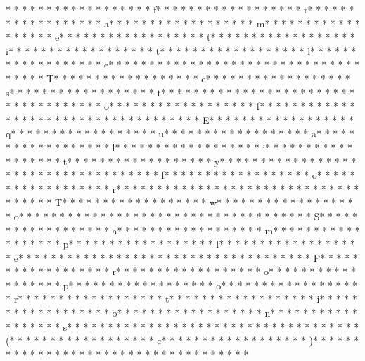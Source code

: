 * * *  * * *  * * *  *  * * *  *  * * *  * f* * *  * * *  * * *  *  * * *  *  * * *  * r* * *  * * *  * * *  *  * * *  *  * * *  * a* * *  * * *  * * *  *  * * *  *  * * *  * m* * *  * * *  * * *  *  * * *  *  * * *  * e* * *  * * *  * * *  *  * * *  *  * * *  * t* * *  * * *  * * *  *  * * *  *  * * *  * i* * *  * * *  * * *  *  * * *  *  * * *  * t* * *  * * *  * * *  *  * * *  *  * * *  * l* * *  * * *  * * *  *  * * *  *  * * *  * e* * *  * * *  * * *  *  * * *  *  * * *  * {* * *  * * *  * * *  *  * * *  *  * * *  * T* * *  * * *  * * *  *  * * *  *  * * *  * e* * *  * * *  * * *  *  * * *  *  * * *  * s* * *  * * *  * * *  *  * * *  *  * * *  * t* * *  * * *  * * *  *  * * *  *  * * *  *  * * *  * * *  * * *  *  * * *  *  * * *  * o* * *  * * *  * * *  *  * * *  *  * * *  * f* * *  * * *  * * *  *  * * *  *  * * *  *  * * *  * * *  * * *  *  * * *  *  * * *  * E* * *  * * *  * * *  *  * * *  *  * * *  * q* * *  * * *  * * *  *  * * *  *  * * *  * u* * *  * * *  * * *  *  * * *  *  * * *  * a* * *  * * *  * * *  *  * * *  *  * * *  * l* * *  * * *  * * *  *  * * *  *  * * *  * i* * *  * * *  * * *  *  * * *  *  * * *  * t* * *  * * *  * * *  *  * * *  *  * * *  * y* * *  * * *  * * *  *  * * *  *  * * *  *  * * *  * * *  * * *  *  * * *  *  * * *  * f* * *  * * *  * * *  *  * * *  *  * * *  * o* * *  * * *  * * *  *  * * *  *  * * *  * r* * *  * * *  * * *  *  * * *  *  * * *  *  * * *  * * *  * * *  *  * * *  *  * * *  * T* * *  * * *  * * *  *  * * *  *  * * *  * w* * *  * * *  * * *  *  * * *  *  * * *  * o* * *  * * *  * * *  *  * * *  *  * * *  *  * * *  * * *  * * *  *  * * *  *  * * *  * S* * *  * * *  * * *  *  * * *  *  * * *  * a* * *  * * *  * * *  *  * * *  *  * * *  * m* * *  * * *  * * *  *  * * *  *  * * *  * p* * *  * * *  * * *  *  * * *  *  * * *  * l* * *  * * *  * * *  *  * * *  *  * * *  * e* * *  * * *  * * *  *  * * *  *  * * *  *  * * *  * * *  * * *  *  * * *  *  * * *  * P* * *  * * *  * * *  *  * * *  *  * * *  * r* * *  * * *  * * *  *  * * *  *  * * *  * o* * *  * * *  * * *  *  * * *  *  * * *  * p* * *  * * *  * * *  *  * * *  *  * * *  * o* * *  * * *  * * *  *  * * *  *  * * *  * r* * *  * * *  * * *  *  * * *  *  * * *  * t* * *  * * *  * * *  *  * * *  *  * * *  * i* * *  * * *  * * *  *  * * *  *  * * *  * o* * *  * * *  * * *  *  * * *  *  * * *  * n* * *  * * *  * * *  *  * * *  *  * * *  * s* * *  * * *  * * *  *  * * *  *  * * *  *  * * *  * * *  * * *  *  * * *  *  * * *  * (* * *  * * *  * * *  *  * * *  *  * * *  * c* * *  * * *  * * *  *  * * *  *  * * *  * )* * *  * * *  * * *  *  * * *  *  * * *  * }* * *  * * *  * * *  *  * * *  *  * * *  * 
